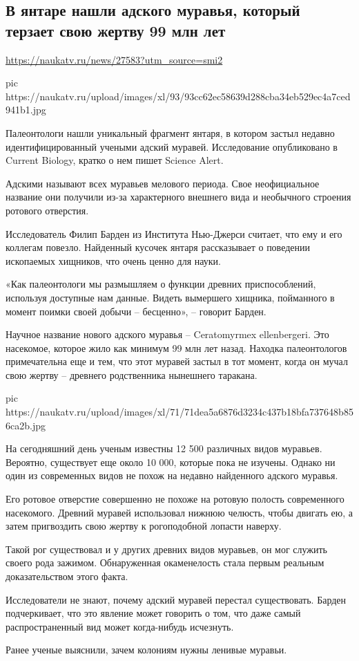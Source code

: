  
 

\subsection{В янтаре нашли адского муравья, который терзает свою жертву 99 млн лет}

\url{https://naukatv.ru/news/27583?utm_source=smi2}

\ifcmt
  pic https://naukatv.ru/upload/images/xl/93/93cc62ec58639d288cba34eb529ec4a7ced941b1.jpg
\fi

Палеонтологи нашли уникальный фрагмент янтаря, в котором застыл недавно
идентифицированный учеными адский муравей. Исследование опубликовано в Current
Biology, кратко о нем пишет Science Alert.

Адскими называют всех муравьев мелового периода. Свое неофициальное название
они получили из-за характерного внешнего вида и необычного строения ротового
отверстия.

Исследователь Филип Барден из Института Нью-Джерси считает, что ему и его
коллегам повезло. Найденный кусочек янтаря рассказывает о поведении ископаемых
хищников, что очень ценно для науки.

«Как палеонтологи мы размышляем о функции древних приспособлений, используя
доступные нам данные. Видеть вымершего хищника, пойманного в момент поимки
своей добычи – бесценно», – говорит Барден.

Научное название нового адского муравья – Ceratomyrmex ellenbergeri. Это
насекомое, которое жило как минимум 99 млн лет назад. Находка палеонтологов
примечательна еще и тем, что этот муравей застыл в тот момент, когда он мучал
свою жертву – древнего родственника нынешнего таракана.

\ifcmt
pic https://naukatv.ru/upload/images/xl/71/71dea5a6876d3234c437b18bfa737648b856ca2b.jpg
\fi

На сегодняшний день ученым известны 12 500 различных видов муравьев. Вероятно,
существует еще около 10 000, которые пока не изучены. Однако ни один из
современных видов не похож на недавно найденного адского муравья.

Его ротовое отверстие совершенно не похоже на ротовую полость современного
насекомого. Древний муравей использовал нижнюю челюсть, чтобы двигать ею, а
затем пригвоздить свою жертву к рогоподобной лопасти наверху.

Такой рог существовал и у других древних видов муравьев, он мог служить своего
рода зажимом. Обнаруженная окаменелость стала первым реальным доказательством
этого факта.

Исследователи не знают, почему адский муравей перестал существовать. Барден
подчеркивает, что это явление может говорить о том, что даже самый
распространенный вид может когда-нибудь исчезнуть.   

Ранее ученые выяснили, зачем колониям нужны ленивые муравьи.


